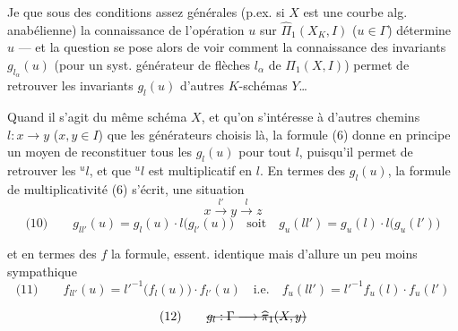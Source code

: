 \documentclass[11pt,a4paper]{article}
\begin{document}
Je  que sous des conditions assez générales (p.ex. si $X$ est une courbe alg. anabélienne) la connaissance de l'opération $u$ sur $\widehat{\Pi}_1(X_K, I)$  ($u \in \Gamma$)  détermine $u$ — et la question se pose alors de voir comment la  connaissance des invariants $g_{l_\alpha}(u)$ (pour un syst. générateur de flèches $l_\alpha$ de $\Pi_1(X, I)$) permet de retrouver les invariants $g_l(u)$  d'autres $K$-schémas $Y$…

Quand il s'agit du même schéma $X$, et qu'on s'intéresse à d'autres chemins $l : x \to y$ ($x, y \in I$) que les générateurs choisis là, la formule (6) donne en principe un moyen de reconstituer tous les $g_l(u)$ pour tout $l$, puisqu'il permet de retrouver les ${}^{u}l$, et que ${}^{u}l$ est multiplicatif en $l$. En termes des $g_l(u)$,  la formule de multiplicativité (6) s'écrit,  une situation
\[
x \xrightarrow{\ l'\ } y \xrightarrow{\ l\ } z
\]
\[
\text{(10)}\qquad g_{ll'}(u) = g_l(u)\cdot l\bigl(g_{l'}(u)\bigr) \quad\text{soit}\quad g_u(ll') = g_u(l)\cdot l\bigl(g_u(l')\bigr)
\]


et en termes des $f$  la formule, essent. identique mais d'allure un peu moins sympathique
\[
\text{(11)}\qquad f_{ll'}(u) = l'^{-1}\bigl(f_l(u)\bigr)\cdot f_{l'}(u) \quad\text{i.e.}\quad f_u(ll') = l'^{-1}f_u(l)\cdot f_u(l')
\]

\[
\text{(12)}\qquad \text{\struck{$g_l : \Gamma \longrightarrow \widehat{\pi}_1(X,y)$}}
\]
  
\end{document}
